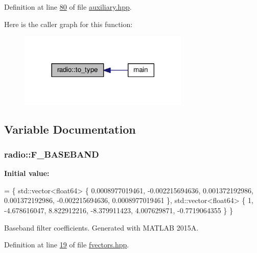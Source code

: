Definition at line \hyperlink{auxiliary_8hpp_source_l00080}{80} of file \hyperlink{auxiliary_8hpp_source}{auxiliary.\+hpp}.



Here is the caller graph for this function\+:
\nopagebreak
\begin{figure}[H]
\begin{center}
\leavevmode
\includegraphics[width=230pt]{namespaceradio_a402fe28e2e2bb2be7a0d2d9f74cc640d_icgraph}
\end{center}
\end{figure}




\subsection{Variable Documentation}
\hypertarget{namespaceradio_a9bd902e9216499953a5906de73dc1796}{
\subsubsection[{F\+\_\+\+B\+A\+S\+E\+B\+A\+N\+D}]{ radio\+::\+F\+\_\+\+B\+A\+S\+E\+B\+A\+N\+D}}\label{namespaceradio_a9bd902e9216499953a5906de73dc1796}
{\bfseries Initial value\+:}
\begin{DoxyCode}
= \{ std::vector<float64> \{
        0.0008977019461,
            -0.002215694636,
            0.001372192986,
            0.001372192986,
            -0.002215694636,
            0.0008977019461 
    \}, std::vector<float64> \{
        1,
            -4.678616047,
            8.822912216,
            -8.379911423,
            4.007629871,
            -0.7719064355
    \} \}
\end{DoxyCode}
Baseband filter coefficients. Generated with M\+A\+T\+L\+A\+B 2015\+A. 

Definition at line \hyperlink{fvectors_8hpp_source_l00019}{19} of file \hyperlink{fvectors_8hpp_source}{fvectors.\+hpp}.

